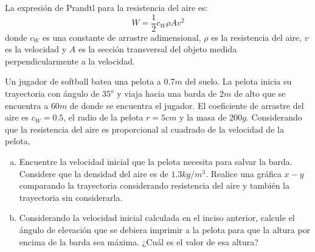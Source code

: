 \begin{mdframed}[style=warning]
	\begin{ejercicio}
		La expresión de Prandtl para la resistencia del aire es:
			$$ W = \frac{1}{2} c_W \rho A v^2 $$
		donde $c_W$ es una constante de arrastre adimensional, $\rho$ es la resistencia del aire, $v$ es la velocidad y $A$ es la sección transversal del objeto medida perpendicularmente a la velocidad.
		
		Un jugador de softball batea una pelota a $0.7m$ del suelo. La pelota inicia su trayectoria con ángulo de $35^o$ y viaja hacia una barda de $2m$ de alto que se encuentra a $60m$ de donde se encuentra el jugador. El coeficiente de arrastre del aire es $c_W = 0.5$, el radio de la pelota $r = 5cm$ y la masa de $200g$. Considerando que la resistencia del aire es proporcional al cuadrado de la velocidad de la pelota,
		\begin{enumerate}[a)]
			\item Encuentre la velocidad inicial que la pelota necesita para salvar la barda. Considere que la densidad del aire es de $1.3 kg/m^3$. Realice una gráfica $x-y$ comparando la trayectoria considerando resistencia del aire y también la trayectoria sin considerarla.
			\item Considerando la velocidad inicial calculada en el inciso anterior, calcule el ángulo de elevación que se debiera imprimir a la pelota para que la altura por encima de la barda sea máxima. ¿Cuál es el valor de esa altura?
		\end{enumerate}
	\end{ejercicio}
\end{mdframed}